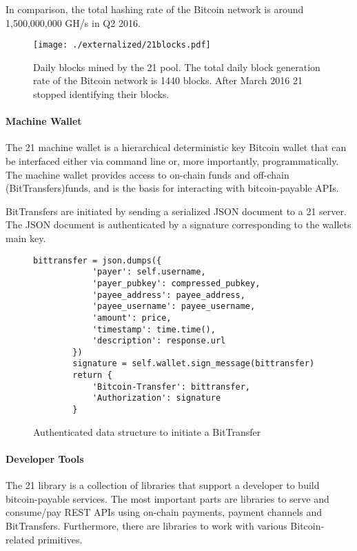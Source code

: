 In comparison, the total hashing rate of the Bitcoin network is around 1,500,000,000 GH/s in Q2 2016.

\begin{figure}
\centering
\texttt{[image: ./externalized/21blocks.pdf]}
\caption{Daily blocks mined by the 21 pool. The total daily block generation rate of the Bitcoin network is 1440 blocks. After March 2016 21 stopped identifying their blocks.}
\label{fig:21blocks}
\end{figure} 

\paragraph{Machine Wallet}

The 21 machine wallet is a hierarchical deterministic key Bitcoin wallet that can be interfaced either via command line or, more importantly, programmatically. The machine wallet provides access to on-chain funds and off-chain (BitTransfers)funds, and is the basis for interacting with bitcoin-payable APIs. 

BitTransfers are initiated by sending a serialized JSON document to a 21 server. The JSON document is authenticated by a signature corresponding to the wallets main key. 

\begin{figure}
\label{lst:21bittransfer}
\begin{lstlisting}[breaklines]
        bittransfer = json.dumps({
            'payer': self.username,
            'payer_pubkey': compressed_pubkey,
            'payee_address': payee_address,
            'payee_username': payee_username,
            'amount': price,
            'timestamp': time.time(),
            'description': response.url
        })      
        signature = self.wallet.sign_message(bittransfer)
        return {
            'Bitcoin-Transfer': bittransfer,
            'Authorization': signature
        }
\end{lstlisting}
\caption{Authenticated data structure to initiate a BitTransfer%
}
\end{figure}


\paragraph{Developer Tools}

The 21 library is a collection of libraries that support a developer to build bitcoin-payable services. The most important parts are libraries to serve and consume/pay REST APIs using on-chain payments, payment channels and BitTransfers. Furthermore, there are libraries to work with various Bitcoin-related primitives.  



